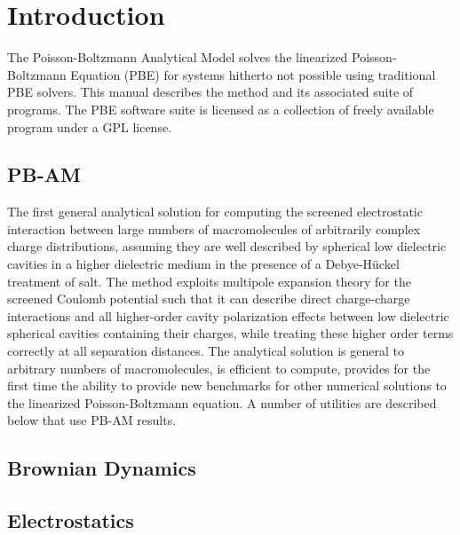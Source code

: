 
\chapter{Introduction}



The Poisson-Boltzmann Analytical Model solves the 
linearized Poisson-Boltzmann Equation (PBE) for systems hitherto not possible 
using traditional PBE solvers. 
This manual describes the method and its associated suite of programs. 
The PBE software suite is licensed as a collection of freely available program 
under a GPL license. 




\section{PB-AM} The first general analytical solution for computing the screened electrostatic interaction between large numbers of macromolecules of arbitrarily complex charge distributions, assuming they are well described by spherical low dielectric cavities in a higher dielectric medium in the presence of a Debye-Hückel treatment of salt. The method exploits multipole expansion theory for the screened Coulomb potential such that it can describe direct charge-charge interactions and all higher-order cavity polarization effects between low dielectric spherical cavities containing their charges, while treating these higher order terms correctly at all separation distances. The analytical solution is general to arbitrary numbers of macromolecules, is efficient to compute, provides for the first time the ability to provide new benchmarks for other numerical solutions to the linearized Poisson-Boltzmann equation. A number of utilities are described below that use PB-AM results.


\section{Brownian Dynamics}

\section{Electrostatics}


